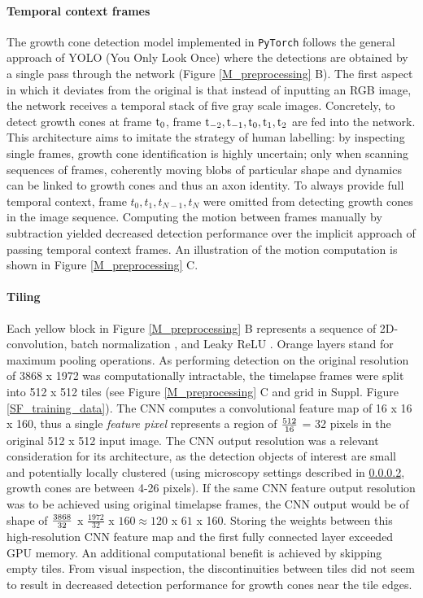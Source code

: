 \paragraph{Temporal context frames}
The growth cone detection model implemented in \verb|PyTorch| follows the
general approach of YOLO (You Only Look Once) \parencite{yolo} where the
detections are obtained by a single pass through the network (Figure
\ref{M_preprocessing} B). The first aspect in which it deviates from the
original is that instead of inputting an RGB image, the network receives a
temporal stack of five gray scale images. Concretely, to detect growth cones at
frame $\rm t_0$, frame $\rm t_{-2}, t_{-1}, t_{0}, t_{1}, t_{2}$ are fed into
the network. This architecture aims to imitate the strategy of human labelling:
by inspecting single frames, growth cone identification is highly uncertain;
only when scanning sequences of frames, coherently moving blobs of particular
shape and dynamics can be linked to growth cones and thus an axon identity. To
always provide full temporal context, frame $t_{0}, t_{1}, t_{N-1}, t_{N}$ were
omitted from detecting growth cones in the image sequence. Computing the motion
between frames manually by subtraction yielded decreased detection performance
over the implicit approach of passing temporal context frames. An illustration
of the motion computation is shown in Figure \ref{M_preprocessing} C.

\paragraph{Tiling}
Each yellow block in Figure \ref{M_preprocessing} B represents a sequence of
2D-convolution, batch normalization \parencite{BN}, and Leaky ReLU
\parencite{leakyrelu}. Orange layers stand for maximum pooling operations. As
performing detection on the original resolution of 3868 x 1972 was
computationally intractable, the timelapse frames were split into 512 x 512
tiles (see Figure \ref{M_preprocessing} C and grid in Suppl. Figure
\ref{SF_training_data}). The CNN computes a convolutional feature map of 16 x 16
x 160, thus a single \textit{feature pixel} represents a region of $\rm
\frac{512}{16}$ = 32 pixels in the original 512 x 512 input image. The CNN
output resolution was a relevant consideration for its architecture, as the
detection objects of interest are small and potentially locally clustered (using
microscopy settings described in \ref{}, growth cones are between 4-26 pixels).
If the same CNN feature output resolution was to be achieved using original
timelapse frames, the CNN output would be of shape of $\rm \frac{3868}{32}$ x
$\frac{1972}{32}$ x $160 \approx 120$ x $61$ x 160. Storing the weights between
this high-resolution CNN feature map and the first fully connected layer exceeded  
GPU memory. An additional computational benefit is achieved by skipping empty
tiles. From visual inspection, the discontinuities between tiles did not seem to
result in decreased detection performance for growth cones near the tile edges. 


